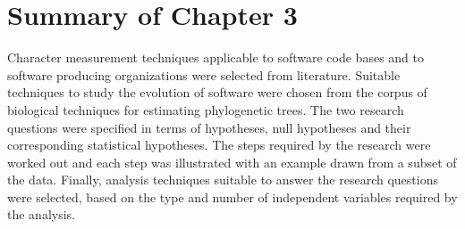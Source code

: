 \section{Summary of Chapter 3}
Character measurement techniques applicable to software code bases and to software producing organizations were selected from literature. Suitable techniques to study the evolution of software were chosen from the corpus of biological techniques for estimating phylogenetic trees. The two research questions were specified in terms of hypotheses, null hypotheses and their corresponding statistical hypotheses. The steps required by the research were worked out and each step was illustrated with an example drawn from a subset of the data. Finally, analysis techniques suitable to answer the research questions were selected, based on the type and number of independent variables required by the analysis.


